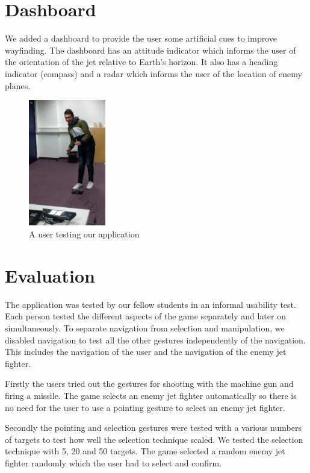 \documentclass{acm_proc_article-sp}
\begin{document}
\section{Dashboard}
We added a dashboard to provide the user some artificial cues to improve wayfinding. The dashboard has an attitude indicator which informs the user of the orientation of the jet relative to Earth's horizon. It also has a heading indicator (compass) and a radar which informs the user of the location of enemy planes.

\newpage


\begin{figure}[Ht]
\centering
\includegraphics[width=0.3\textwidth ,keepaspectratio=true]{./img/usertest.jpg}
\caption{A user testing our application}
 \label{usertester}
\end{figure}

\section{Evaluation}
The application was tested by our fellow students in an informal usability test.
Each person tested the different aspects of the game separately and later on simultaneously.
To separate navigation from selection and manipulation, we disabled navigation to test all the other gestures independently of the navigation. This includes the navigation of the user and the navigation of the enemy jet fighter.

Firstly the users tried out the gestures for shooting with the machine gun and firing a missile.
The game selects an enemy jet fighter automatically so there is no need for the user to use a pointing gesture to select an enemy jet fighter.

Secondly the pointing and selection gestures were tested with a various numbers of targets to test how well the selection technique scaled. We tested the selection technique with 5, 20 and 50 targets.
The game selected a random enemy jet fighter randomly which the user had to select and confirm.
\end{document}
